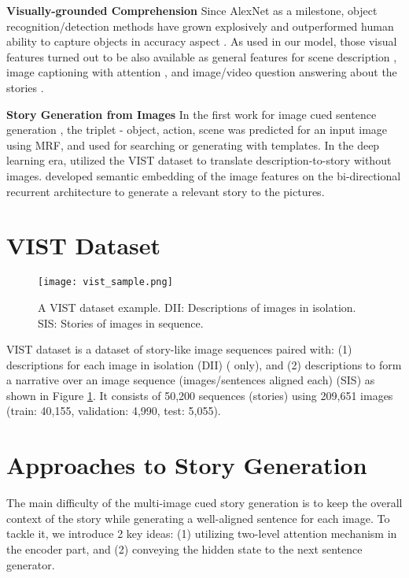 \documentclass[11pt,a4paper]{article}
\begin{document}
\textbf{Visually-grounded Comprehension}  Since AlexNet \cite{kriz2012imgnet} as a milestone,  object recognition/detection methods have grown explosively and outperformed human ability to capture objects in accuracy aspect \cite{geirhos2017comphuman}. 
As used in our model, those visual features turned out to be also available as general features for scene description \cite{karpathy2016densecap,Karpathy2017dva}, image captioning with attention \cite{xu2015showattend}, and image/video question answering about the stories \cite{MovieQA,kim2017deepstory}.

\textbf{Story Generation from Images}
In the first work for image cued sentence generation \cite{farhadi2010every}, the triplet - object, action, scene was predicted for an input image using MRF, and used for searching or generating with templates.
In the deep learning era, \citet{jain2017story} utilized the VIST dataset to translate description-to-story without images.
\citet{Liu2017let-photos-talk} developed semantic embedding of the image features on the bi-directional recurrent architecture to generate a relevant story to the pictures.




\section{VIST Dataset}
\begin{figure}[h!]
\texttt{[image: vist\_sample.png]}
\caption{A VIST dataset example. DII: Descriptions of images in isolation. SIS: Stories of images in sequence.}
\label{fig:vist}
\end{figure}
VIST dataset is a dataset of story-like image sequences paired with: (1) descriptions for each image in isolation (DII) ( only), and (2) descriptions to form a narrative over an image sequence (images/sentences aligned each) (SIS) as shown in Figure \ref{fig:vist}.
It consists of 50,200 sequences (stories) using 209,651 images (train: 40,155, validation: 4,990, test: 5,055).


\section{Approaches to Story Generation}

The main difficulty of the multi-image cued story generation is to keep the overall context of the story while generating a well-aligned sentence for each image. 
To tackle it, we introduce 2 key ideas: (1) utilizing two-level attention mechanism in the encoder part, and (2) conveying the hidden state to the next sentence generator.
\end{document}
